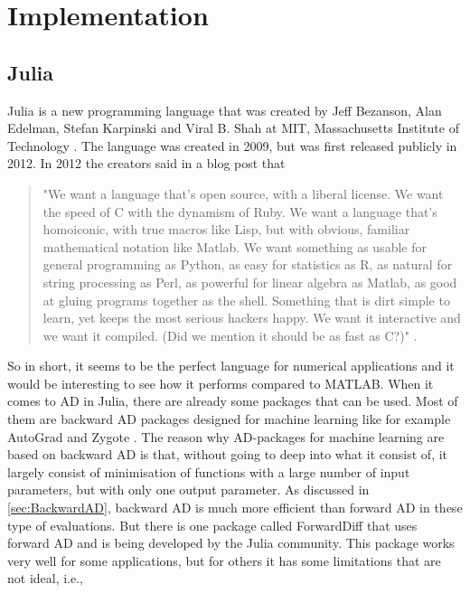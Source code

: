 \chapter{Implementation}
\section{Julia}
\label{sec:Julia}
Julia is a new programming language that was created by Jeff Bezanson, Alan Edelman, Stefan Karpinski and Viral B. Shah  at MIT, Massachusetts Institute of Technology \emph{\citep{juliaLab}}. The language was created in 2009, but was first released publicly in 2012. In 2012 the creators said in a blog post that
\begin{quotation}
"We want a language that’s open source, with a liberal license. We want the speed of C with the dynamism of Ruby. We want a language that’s homoiconic, with true macros like Lisp, but with obvious, familiar mathematical notation like Matlab. We want something as usable for general programming as Python, as easy for statistics as R, as natural for string processing as Perl, as powerful for linear algebra as Matlab, as good at gluing programs together as the shell. Something that is dirt simple to learn, yet keeps the most serious hackers happy. We want it interactive and we want it compiled. (Did we mention it should be as fast as C?)"\emph{\citep{juliaBlogRelease2012}} .
\end{quotation}
So in short, it seems to be the perfect language for numerical applications and it would be interesting to see how it performs compared to MATLAB. When it comes to AD in Julia, there are already some packages that can be used. Most of them are backward AD packages designed for machine learning like for example AutoGrad \emph{\citep{knet2016mlsys}} and Zygote \emph{\citep{innes2018don}}. The reason why AD-packages for machine learning are based on backward AD is that, without going to deep into what it consist of, it largely consist of minimisation of functions with a large number of input parameters, but with only one output parameter. As discussed in \autoref{sec:BackwardAD}, backward AD is much more efficient than forward AD in these type of evaluations. But there is one package called ForwardDiff \emph{\citep{ForwardDiff}} that uses forward AD and is being developed by the Julia community. This package works very well for some applications, but for others it has some limitations that are not ideal, i.e., 
